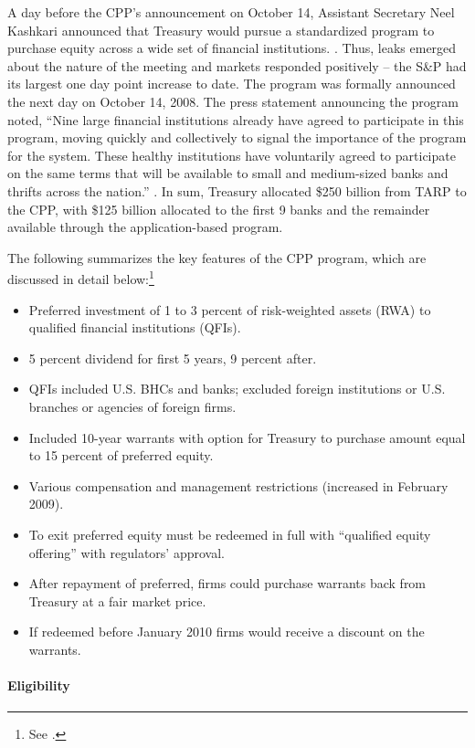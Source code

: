 \documentclass[12pt]{article}
\begin{document}
A day before the CPP's announcement on October 14, Assistant Secretary Neel Kashkari announced that Treasury would pursue a standardized program to purchase equity across a wide set of financial institutions. \citep{Ba}. Thus, leaks emerged about the nature of the meeting and markets responded positively -- the S\&P had its largest one day point increase to date. The program was formally announced the next day on October 14, 2008. The press statement announcing the program noted, ``Nine large financial institutions already have agreed to participate in this program, moving quickly and collectively to signal the importance of the program for the system. These healthy institutions have voluntarily agreed to participate on the same terms that will be available to small and medium-sized banks and thrifts across the nation.'' \citep{CPPAnnouncement}. In sum, Treasury allocated \$250 billion from TARP to the CPP, with \$125 billion allocated to the first 9 banks and the remainder available through the application-based program.

The following summarizes the key features of the CPP program, which are discussed in detail below:\footnote{See \citet{mofo}.}

\begin{itemize}[label={--}]
\item Preferred investment of 1 to 3 percent of risk-weighted assets (RWA) to qualified financial institutions (QFIs).
\item 5 percent dividend for first 5 years, 9 percent after.
\item QFIs included U.S. BHCs and banks; excluded foreign institutions or U.S. branches or agencies of foreign firms.
\item Included 10-year warrants with option for Treasury to purchase amount equal to 15 percent of preferred equity.
\item Various compensation and management restrictions (increased in February 2009).
\item To exit preferred equity must be redeemed in full with ``qualified equity offering'' with regulators' approval.
\item After repayment of preferred, firms could purchase warrants back from Treasury at a fair market price.
\item If redeemed before January 2010 firms would receive a discount on the warrants.
\end{itemize}

\paragraph{Eligibility}
\end{document}
